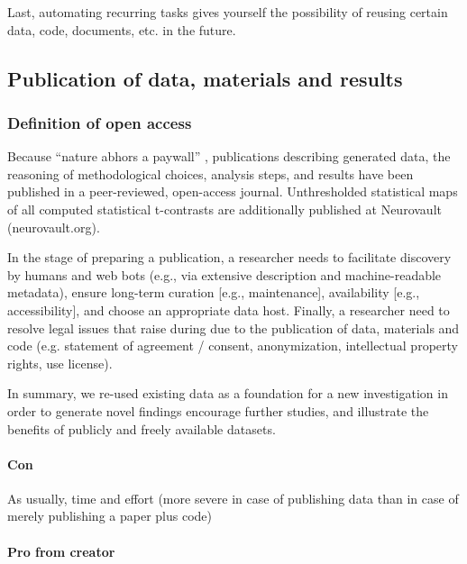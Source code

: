 %
Last, automating recurring tasks gives yourself the possibility of reusing
certain data, code, documents, etc. in the future.



\subsection{Publication of data, materials and results}


\subsubsection{Definition of open access}

Because ``nature abhors a paywall'' \citep{dupre2020nature}, publications
describing generated data, the reasoning of methodological choices, analysis
steps, and results \citep{haeusler2021speechanno, haeusler2022processing} have
been published in a peer-reviewed, open-access journal.
%
Unthresholded statistical maps of all computed statistical t-contrasts are
additionally published at Neurovault (neurovault.org).


In the stage of preparing a publication, a researcher needs to facilitate
discovery by humans and web bots (e.g., via extensive description and
machine-readable metadata), ensure long-term curation [e.g., maintenance],
availability [e.g., accessibility], and choose an appropriate data host.
Finally, a researcher need to resolve legal issues that raise during due to the
publication of data, materials and code (e.g. statement of agreement / consent,
anonymization, intellectual property rights, use license).

In summary, we re-used existing data as a foundation for a new investigation in
order to generate novel findings encourage further studies, and illustrate the
benefits of publicly and freely available datasets.


\paragraph{Con}

As usually, time and effort (more severe in case of publishing data than in case
of merely publishing a paper plus code)

\paragraph{Pro from creator}

